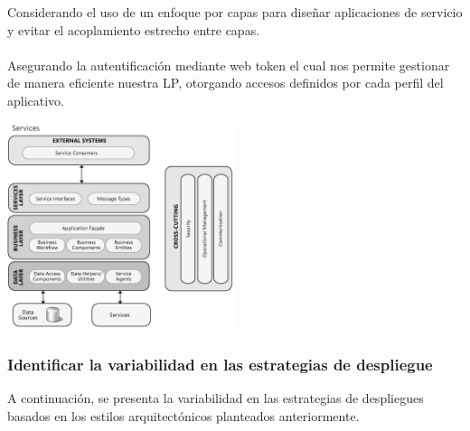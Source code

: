 \documentclass[10pt,a4paper,openany]{book}
\begin{document}
\begin{enumerate}
\begin{itemize}
	Considerando el uso de un enfoque por capas para diseñar aplicaciones de servicio y evitar el acoplamiento estrecho entre capas.\\\\
	Asegurando la autentificación mediante web token el cual nos permite gestionar de manera eficiente nuestra LP, otorgando accesos definidos por cada perfil del aplicativo.
\end{itemize}
\begin{center}
\includegraphics[width=0.5\textwidth]{arq2}
\end{center}
\end{enumerate}



\subsubsection{Identificar la variabilidad en las estrategias de despliegue}

A continuación, se presenta la variabilidad en las estrategias de despliegues basados en los estilos arquitectónicos planteados anteriormente. 
\end{document}
